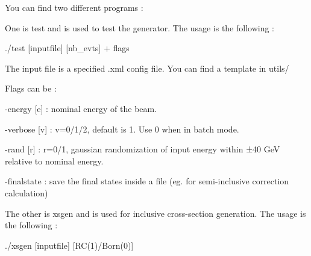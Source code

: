You can find two different programs \+:
\begin{DoxyItemize}
\item One is {\ttfamily test} and is used to test the generator. The usage is the following \+:
\begin{DoxyItemize}
\item {\ttfamily ./test \mbox{[}inputfile\mbox{]} \mbox{[}nb\+\_\+evts\mbox{]} + flags}
\item The input file is a specified .xml config file. You can find a template in {\ttfamily utils/}
\item Flags can be \+:
\begin{DoxyItemize}
\item {\ttfamily -\/energy \mbox{[}e\mbox{]}} \+: nominal energy of the beam.
\item {\ttfamily -\/verbose \mbox{[}v\mbox{]}} \+: v=0/1/2, default is 1. Use 0 when in batch mode.
\item {\ttfamily -\/rand \mbox{[}r\mbox{]}} \+: r=0/1, gaussian randomization of input energy within ±40 GeV relative to nominal energy.
\item {\ttfamily -\/finalstate} \+: save the final states inside a file (eg. for semi-\/inclusive correction calculation)
\end{DoxyItemize}
\end{DoxyItemize}
\item The other is {\ttfamily xsgen} and is used for inclusive cross-\/section generation. The usage is the following \+:
\begin{DoxyItemize}
\item {\ttfamily ./xsgen \mbox{[}inputfile\mbox{]} \mbox{[}R\+C(1)/\+Born(0)\mbox{]}} 
\end{DoxyItemize}
\end{DoxyItemize}